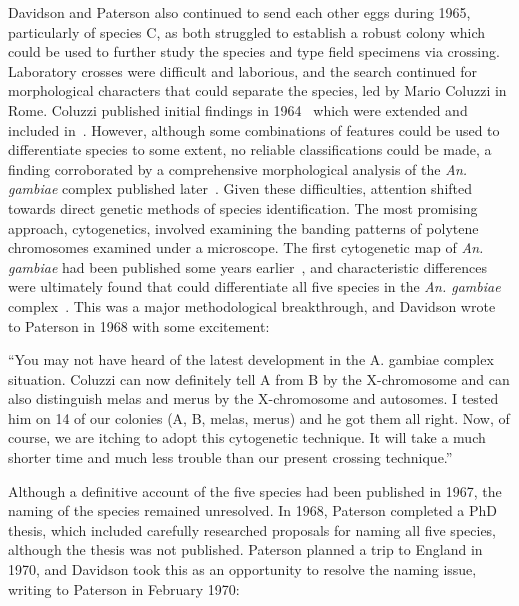 \begin{refsection}
Davidson and Paterson also continued to send each other eggs during 1965, particularly of species C, as both struggled to establish a robust colony which could be used to further study the species and type field specimens via crossing.
%
Laboratory crosses were difficult and laborious, and the search continued for morphological characters that could separate the species, led by Mario Coluzzi in Rome.
%
Coluzzi published initial findings in 1964~\parencite{Coluzzi1964} which were extended and included in~\textcite{Davidson1967}.
%
However, although some combinations of features could be used to differentiate species to some extent, no reliable classifications could be made, a finding corroborated by a comprehensive morphological analysis of the \textit{An. gambiae} complex published later~\parencite{Coetzee1989}.
%
Given these difficulties, attention shifted towards direct genetic methods of species identification.
%
The most promising approach, cytogenetics, involved examining the banding patterns of polytene chromosomes examined under a microscope.
%
The first cytogenetic map of \textit{An. gambiae} had been published some years earlier~\parencite{Frizzi1956}, and characteristic differences were ultimately found that could differentiate all five species in the \textit{An. gambiae} complex~\parencite{Coluzzi1967,Coluzzi1968,Coluzzi1969}.
%
This was a major methodological breakthrough, and Davidson wrote to Paterson in 1968 with some excitement:


\begin{displayquote}
``You may not have heard of the latest development in the A. gambiae complex situation. Coluzzi can now definitely tell A from B by the X-chromosome and can also distinguish melas and merus by the X-chromosome and autosomes. I tested him on 14 of our colonies (A, B, melas, merus) and he got them all right. Now, of course, we are itching to adopt this cytogenetic technique. It will take a much shorter time and much less trouble than our present crossing technique.''
\end{displayquote}


Although a definitive account of the five species had been published in 1967, the naming of the species remained unresolved.
%
In 1968, Paterson completed a PhD thesis, which included carefully researched proposals for naming all five species, although the thesis was not published.
%
Paterson planned a trip to England in 1970, and Davidson took this as an opportunity to resolve the naming issue, writing to Paterson in February 1970:



\end{refsection}
